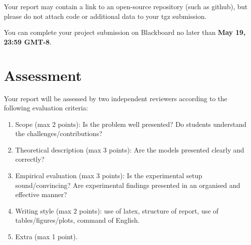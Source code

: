 Your report may contain a link to an open-source repository (such as github), but please do not attach code or additional data to your tgz submission.

You can complete your project submission on Blackboard no later than {\bf May 19, 23:59 GMT-8}.


\section{Assessment}

Your report will be assessed by two independent reviewers according to the following evaluation criteria:
\begin{enumerate}
	\item Scope (max 2 points): Is the problem well presented? Do students understand the challenges/contributions?
	\item Theoretical description (max 3 points): Are the models presented clearly and correctly?
	\item Empirical evaluation (max 3 points): Is the experimental setup sound/convincing? Are experimental findings presented in an organised and effective manner? 
	\item Writing style (max 2 points): use of latex, structure of report, use of tables/figures/plots, command of English.	
	\item Extra (max 1 point).
\end{enumerate}




